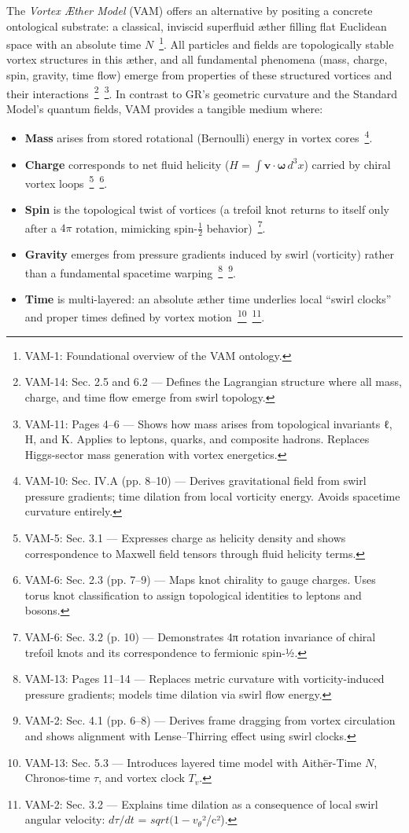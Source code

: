 \documentclass[a4paper,12pt]{article}
\begin{document}
    The \emph{Vortex Æther Model} (VAM) offers an alternative by positing a concrete ontological substrate: a classical, inviscid superfluid æther filling flat Euclidean space with an absolute time $N$~\footnote{VAM-1: Foundational overview of the VAM ontology.}. All particles and fields are topologically stable vortex structures in this æther, and all fundamental phenomena (mass, charge, spin, gravity, time flow) emerge from properties of these structured vortices and their interactions~\footnote{VAM-14: Sec. 2.5 and 6.2 — Defines the Lagrangian structure where all mass, charge, and time flow emerge from swirl topology.}~\footnote{VAM-11: Pages 4–6 — Shows how mass arises from topological invariants ℓ, H, and K. Applies to leptons, quarks, and composite hadrons. Replaces Higgs-sector mass generation with vortex energetics.}. In contrast to GR’s geometric curvature and the Standard Model’s quantum fields, VAM provides a tangible medium where:
    \begin{itemize}
        \item \textbf{Mass} arises from stored rotational (Bernoulli) energy in vortex cores~\footnote{VAM-10: Sec. IV.A (pp. 8–10) — Derives gravitational field from swirl pressure gradients; time dilation from local vorticity energy. Avoids spacetime curvature entirely.}.
        \item \textbf{Charge} corresponds to net fluid helicity ($H=\int \mathbf{v}\cdot\boldsymbol{\omega}\,d^3x$) carried by chiral vortex loops~\footnote{VAM-5: Sec. 3.1 — Expresses charge as helicity density and shows correspondence to Maxwell field tensors through fluid helicity terms.}~\footnote{VAM-6: Sec. 2.3 (pp. 7–9) — Maps knot chirality to gauge charges. Uses torus knot classification to assign topological identities to leptons and bosons.}.
        \item \textbf{Spin} is the topological twist of vortices (a trefoil knot returns to itself only after a $4\pi$ rotation, mimicking spin-$\frac{1}{2}$ behavior)~\footnote{VAM-6: Sec. 3.2 (p. 10) — Demonstrates 4π rotation invariance of chiral trefoil knots and its correspondence to fermionic spin-½.}.
        \item \textbf{Gravity} emerges from pressure gradients induced by swirl (vorticity) rather than a fundamental spacetime warping~\footnote{VAM-13: Pages 11–14 — Replaces metric curvature with vorticity-induced pressure gradients; models time dilation via swirl flow energy.}~\footnote{VAM-2: Sec. 4.1 (pp. 6–8) — Derives frame dragging from vortex circulation and shows alignment with Lense–Thirring effect using swirl clocks.}.
        \item \textbf{Time} is multi-layered: an absolute æther time underlies local “swirl clocks” and proper times defined by vortex motion~\footnote{VAM-13: Sec. 5.3 — Introduces layered time model with Aithēr-Time $N$, Chronos-time $τ$, and vortex clock $T_v$.}~\footnote{VAM-2: Sec. 3.2 — Explains time dilation as a consequence of local swirl angular velocity: $dτ/dt$ = $sqrt(1 - v_θ$²/c²).}.
    \end{itemize}
\end{document}

